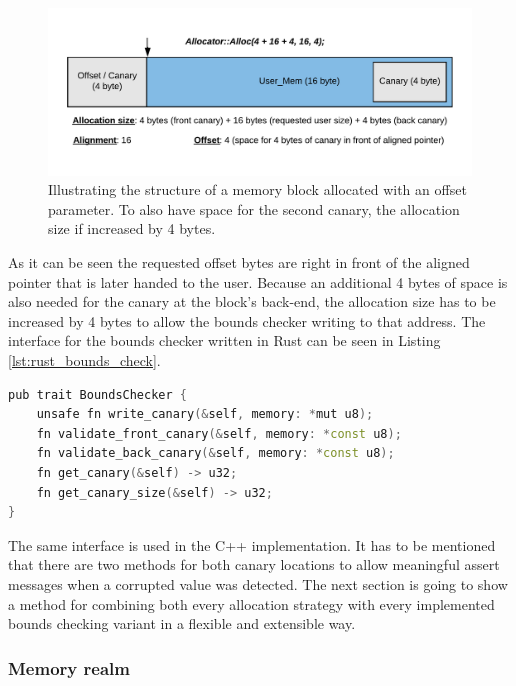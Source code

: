 \clearpage

\begin{figure}[h!]
	\centering \includegraphics[width=\linewidth]{PICs/offset_alloc.png}
	\caption{Illustrating the structure of a memory block allocated with an offset parameter. To also have space for the second canary, the allocation size if increased by 4 bytes.}
	\label{fig:offset_alloc}
\end{figure}

\noindent
As it can be seen the requested offset bytes are right in front of the aligned pointer that is later handed to the user. Because an additional 4 bytes of space is also needed for the canary at the block's back-end, the allocation size has to be increased by 4 bytes to allow the bounds checker writing to that address. The interface for the bounds checker written in Rust can be seen in Listing \ref{lst:rust_bounds_check}.\\

\begin{lstlisting}[caption={Base trait of every bounds checker in the Rust memory system.}, label={lst:rust_bounds_check}, language={C++}]
pub trait BoundsChecker {
	unsafe fn write_canary(&self, memory: *mut u8);
	fn validate_front_canary(&self, memory: *const u8);
	fn validate_back_canary(&self, memory: *const u8);
	fn get_canary(&self) -> u32;
	fn get_canary_size(&self) -> u32;
}
\end{lstlisting}

\noindent
The same interface is used in the C++ implementation. It has to be mentioned that there are two methods for both canary locations to allow meaningful assert messages when a corrupted value was detected. The next section is going to show a method for combining both every allocation strategy with every implemented bounds checking variant in a flexible and extensible way.

\subsubsection{Memory realm}

